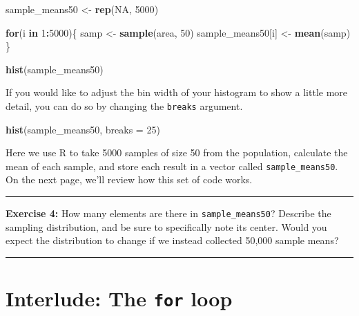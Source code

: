 \documentclass[]{book}
\newenvironment{Shaded}{\begin{snugshade}}{\end{snugshade}}
\newcommand{\KeywordTok}[1]{\textcolor[rgb]{0.13,0.29,0.53}{\textbf{#1}}}
\newcommand{\DataTypeTok}[1]{\textcolor[rgb]{0.13,0.29,0.53}{#1}}
\newcommand{\DecValTok}[1]{\textcolor[rgb]{0.00,0.00,0.81}{#1}}
\newcommand{\StringTok}[1]{\textcolor[rgb]{0.31,0.60,0.02}{#1}}
\newcommand{\OtherTok}[1]{\textcolor[rgb]{0.56,0.35,0.01}{#1}}
\newcommand{\ControlFlowTok}[1]{\textcolor[rgb]{0.13,0.29,0.53}{\textbf{#1}}}
\newcommand{\OperatorTok}[1]{\textcolor[rgb]{0.81,0.36,0.00}{\textbf{#1}}}
\newcommand{\NormalTok}[1]{#1}
\theoremstyle{definition}
\theoremstyle{definition}
\theoremstyle{definition}
\theoremstyle{remark}
\begin{document}
\begin{Shaded}
\begin{Highlighting}[]
\NormalTok{sample_means50 <-}\StringTok{ }\KeywordTok{rep}\NormalTok{(}\OtherTok{NA}\NormalTok{, }\DecValTok{5000}\NormalTok{)}

\ControlFlowTok{for}\NormalTok{(i }\ControlFlowTok{in} \DecValTok{1}\OperatorTok{:}\DecValTok{5000}\NormalTok{)\{}
\NormalTok{   samp <-}\StringTok{ }\KeywordTok{sample}\NormalTok{(area, }\DecValTok{50}\NormalTok{)}
\NormalTok{   sample_means50[i] <-}\StringTok{ }\KeywordTok{mean}\NormalTok{(samp)}
\NormalTok{   \}}

\KeywordTok{hist}\NormalTok{(sample_means50)}
\end{Highlighting}
\end{Shaded}

If you would like to adjust the bin width of your histogram to show a
little more detail, you can do so by changing the \texttt{breaks}
argument.

\begin{Shaded}
\begin{Highlighting}[]
\KeywordTok{hist}\NormalTok{(sample_means50, }\DataTypeTok{breaks =} \DecValTok{25}\NormalTok{)}
\end{Highlighting}
\end{Shaded}

Here we use R to take 5000 samples of size 50 from the population,
calculate the mean of each sample, and store each result in a vector
called \texttt{sample\_means50}. On the next page, we'll review how this
set of code works.

\begin{center}\rule{0.5\linewidth}{\linethickness}\end{center}

\textbf{Exercise 4:} How many elements are there in
\texttt{sample\_means50}? Describe the sampling distribution, and be
sure to specifically note its center. Would you expect the distribution
to change if we instead collected 50,000 sample means?

\begin{center}\rule{0.5\linewidth}{\linethickness}\end{center}

\section{\texorpdfstring{Interlude: The \texttt{for}
loop}{Interlude: The for loop}}\label{interlude-the-for-loop}
\end{document}
